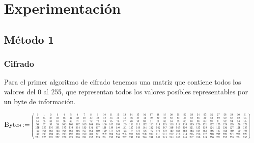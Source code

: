 \documentclass[a4paper]{article}
\newcommand*{\Scale}[2][4]{\scalebox{#1}{$#2$}}%
\begin{document}
\newpage
\section{Experimentación}

\subsection{Método 1}

\subsubsection{Cifrado}
Para el primer algoritmo de cifrado tenemos una matriz que contiene todos los
valores del 0 al 255, que representan todos los valores posibles representables por un byte de información.

\[
\text{Bytes} := \Scale[0.4]{
\left(
\begin{array}{cccccccccccccccccccccccccccccccc}
 0 & 1 & 2 & 3 & 4 & 5 & 6 & 7 & 8 & 9 & 10 & 11 & 12 & 13 & 14 & 15 & 16 & 17
& 18 & 19 & 20 & 21 & 22 & 23 & 24 & 25 & 26 & 27 & 28 & 29 & 30 & 31 \\
 32 & 33 & 34 & 35 & 36 & 37 & 38 & 39 & 40 & 41 & 42 & 43 & 44 & 45 & 46 & 47
& 48 & 49 & 50 & 51 & 52 & 53 & 54 & 55 & 56 & 57 & 58 & 59 & 60 & 61 & 62 & 63
\\
 64 & 65 & 66 & 67 & 68 & 69 & 70 & 71 & 72 & 73 & 74 & 75 & 76 & 77 & 78 & 79
& 80 & 81 & 82 & 83 & 84 & 85 & 86 & 87 & 88 & 89 & 90 & 91 & 92 & 93 & 94 & 95
\\
 96 & 97 & 98 & 99 & 100 & 101 & 102 & 103 & 104 & 105 & 106 & 107 & 108 & 109
& 110 & 111 & 112 & 113 & 114 & 115 & 116 & 117 & 118 & 119 & 120 & 121 & 122 &
123 & 124 & 125 & 126 & 127 \\
 128 & 129 & 130 & 131 & 132 & 133 & 134 & 135 & 136 & 137 & 138 & 139 & 140 &
141 & 142 & 143 & 144 & 145 & 146 & 147 & 148 & 149 & 150 & 151 & 152 & 153 &
154 & 155 & 156 & 157 & 158 & 159 \\
 160 & 161 & 162 & 163 & 164 & 165 & 166 & 167 & 168 & 169 & 170 & 171 & 172 &
173 & 174 & 175 & 176 & 177 & 178 & 179 & 180 & 181 & 182 & 183 & 184 & 185 &
186 & 187 & 188 & 189 & 190 & 191 \\
 192 & 193 & 194 & 195 & 196 & 197 & 198 & 199 & 200 & 201 & 202 & 203 & 204 &
205 & 206 & 207 & 208 & 209 & 210 & 211 & 212 & 213 & 214 & 215 & 216 & 217 &
218 & 219 & 220 & 221 & 222 & 223 \\
 224 & 225 & 226 & 227 & 228 & 229 & 230 & 231 & 232 & 233 & 234 & 235 & 236 &
237 & 238 & 239 & 240 & 241 & 242 & 243 & 244 & 245 & 246 & 247 & 248 & 249 &
250 & 251 & 252 & 253 & 254 & 255 \\
\end{array}
\right)
}
\]
\end{document}
